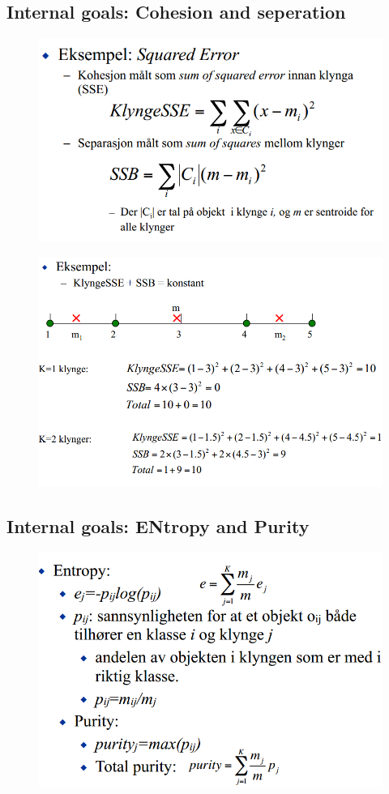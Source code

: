 		\subsection{Internal goals: Cohesion and seperation}

			\begin{figure}[H]
				\centering
				\includegraphics[scale=0.5]{pics/cosep.png}
			\end{figure}
			\begin{figure}[H]
				\centering
				\includegraphics[scale=0.5]{pics/cosep2.png}
			\end{figure}

		\subsection{Internal goals: ENtropy and Purity}

		\begin{figure}[H]
				\centering
				\includegraphics[scale=0.5]{pics/entpu.png}
			\end{figure}


